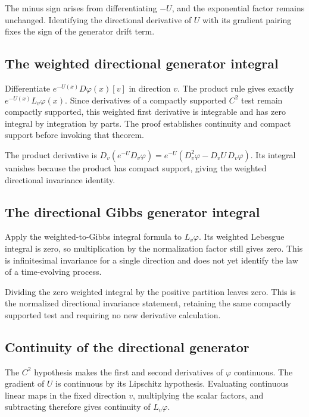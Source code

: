 \documentclass[11pt,a4paper]{article}
\begin{document}
The minus sign arises from differentiating \(-U\), and the exponential factor remains unchanged. Identifying the directional derivative of \(U\) with its gradient pairing fixes the sign of the generator drift term.


\subsection{\texorpdfstring{The weighted directional generator integral}{The weighted directional generator integral}}


Differentiate \(e^{-U(x)}D\varphi(x)[v]\) in direction \(v\). The product rule gives exactly \(e^{-U(x)}L_v\varphi(x)\). Since derivatives of a compactly supported \(C^2\) test remain compactly supported, this weighted first derivative is integrable and has zero integral by integration by parts. The proof establishes continuity and compact support before invoking that theorem.



The product derivative is \(D_v(e^{-U}D_v\varphi)=e^{-U}(D_v^2\varphi-D_vU\,D_v\varphi)\). Its integral vanishes because the product has compact support, giving the weighted directional invariance identity.


\subsection{\texorpdfstring{The directional Gibbs generator integral}{The directional Gibbs generator integral}}


Apply the weighted-to-Gibbs integral formula to \(L_v\varphi\). Its weighted Lebesgue integral is zero, so multiplication by the normalization factor still gives zero. This is infinitesimal invariance for a single direction and does not yet identify the law of a time-evolving process.



Dividing the zero weighted integral by the positive partition leaves zero. This is the normalized directional invariance statement, retaining the same compactly supported test and requiring no new derivative calculation.


\subsection{\texorpdfstring{Continuity of the directional generator}{Continuity of the directional generator}}


The \(C^2\) hypothesis makes the first and second derivatives of \(\varphi\) continuous. The gradient of \(U\) is continuous by its Lipschitz hypothesis. Evaluating continuous linear maps in the fixed direction \(v\), multiplying the scalar factors, and subtracting therefore gives continuity of \(L_v\varphi\).
\end{document}
